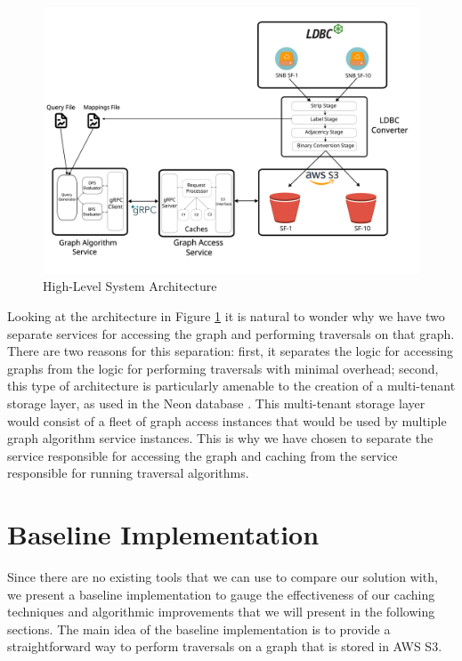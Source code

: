 \begin{figure}[ht]
    \centering
    \includegraphics[width=\textwidth]{figures/architecture.png}
    \caption{High-Level System Architecture}
    \label{fig:sysArch}
\end{figure}

Looking at the architecture in Figure \ref{fig:sysArch} it is natural to wonder
why we have two separate services for accessing the graph and performing
traversals on that graph. There are two reasons for this separation: first, it
separates the logic for accessing graphs from the logic for performing
traversals with minimal overhead; second, this type of architecture is
particularly amenable to the creation of a multi-tenant storage layer, as used
in the Neon database \cite{neonPostgres}. This multi-tenant storage layer would
consist of a fleet of graph access instances that would be used by multiple
graph algorithm service instances. This is why we have chosen to separate
the service responsible for accessing the graph and caching from the service
responsible for running traversal algorithms.

\section{Baseline Implementation}\label{sec:baseline}
Since there are no existing tools that we can use to compare our solution with,
we present a baseline implementation to gauge the effectiveness of our caching
techniques and algorithmic improvements that we will present in the following
sections. The main idea of the baseline implementation is to provide a
straightforward way to perform traversals on a graph that is stored in AWS S3.

